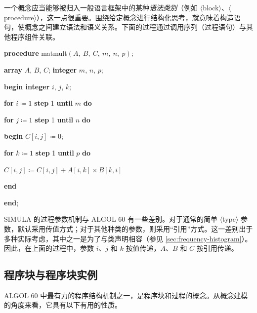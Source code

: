 一个概念应当能够被归入一般语言框架中的某种\textit{语法类别}（例如 $\langle$block$\rangle$、$\langle$procedure$\rangle$），这一点很重要。围绕给定概念进行结构化思考，就意味着构造语句，使概念之间建立语法和语义关系。下面的过程通过调用序列（过程语句）与其他程序组件关联。

\quad \textbf{procedure} matmult$(A,\ B,\ C,\ m,\ n,\ p)$;

\quad \quad \textbf{array} $A$, $B$, $C$; \textbf{integer} $m$, $n$, $p$;

\quad \textbf{begin integer} $i$, $j$, $k$;

\quad \quad \textbf{for} $i\coloneq 1$ \textbf{step} 1 \textbf{until} $m$ \textbf{do}

\quad \quad \textbf{for} $j\coloneq 1$ \textbf{step} 1 \textbf{until} $n$ \textbf{do}

\quad \quad \textbf{begin} $C[i, j]\coloneq 0$;

\quad \quad \quad \textbf{for} $k\coloneq 1$ \textbf{step} 1 \textbf{until} $p$ \textbf{do}

\quad \quad \quad \quad $C[i, j]\coloneq C[i, j] + A[i, k] \times B[k, i]$

\quad \quad \textbf{end}

\quad \textbf{end};

SIMULA 的过程参数机制与 ALGOL 60 有一些差别。对于通常的简单 $\langle$type$\rangle$ 参数，默认采用传值方式；对于其他种类的参数，则采用“引用”方式。这一差别出于多种实际考虑，其中之一是为了与类声明相容（参见 \ref{sec:frequency-histogram}）。因此，在上面的过程中，参数 $i$、$j$ 和 $k$ 按值传递，$A$、$B$ 和 $C$ 按引用传递。

\subsection{程序块与程序块实例}

ALGOL 60 中最有力的程序结构机制之一，是程序块和过程的概念。从概念建模的角度来看，它具有以下有用的性质。

